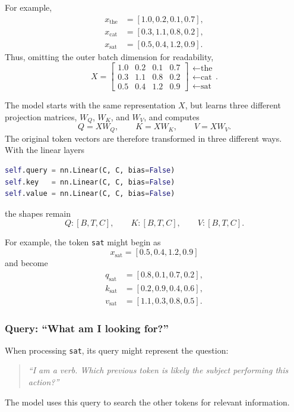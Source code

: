 For example,
\begin{align*}
  x_{\text{the}} &= [1.0,0.2,0.1,0.7],\\
  x_{\text{cat}} &= [0.3,1.1,0.8,0.2],\\
  x_{\text{sat}} &= [0.5,0.4,1.2,0.9].
\end{align*}
Thus, omitting the outer batch dimension for readability,
\[
  X=
  \begin{bmatrix}
    1.0 & 0.2 & 0.1 & 0.7\\
    0.3 & 1.1 & 0.8 & 0.2\\
    0.5 & 0.4 & 1.2 & 0.9
  \end{bmatrix}
  \begin{matrix}
    \leftarrow \text{the}\\
    \leftarrow \text{cat}\\
    \leftarrow \text{sat}
  \end{matrix}.
\]

The model starts with the same representation \(X\), but learns three
different projection matrices, \(W_Q\), \(W_K\), and \(W_V\), and computes
\[
  Q=XW_Q, \qquad K=XW_K, \qquad V=XW_V.
\]
The original token vectors are therefore transformed in three different ways. \\

With the linear layers
\begin{lstlisting}[language=Python]
self.query = nn.Linear(C, C, bias=False)
self.key   = nn.Linear(C, C, bias=False)
self.value = nn.Linear(C, C, bias=False)
\end{lstlisting}
the shapes remain
\[
  Q:[B,T,C], \qquad K:[B,T,C], \qquad V:[B,T,C].
\]

For example, the token \texttt{sat} might begin as
\[
  x_{\text{sat}}=[0.5,0.4,1.2,0.9]
\]
and become
\begin{align*}
  q_{\text{sat}} &= [0.8,0.1,0.7,0.2],\\
  k_{\text{sat}} &= [0.2,0.9,0.4,0.6],\\
  v_{\text{sat}} &= [1.1,0.3,0.8,0.5].
\end{align*}

\subsubsection*{Query: ``What am I looking for?''}

When processing \texttt{sat}, its query might represent the question:
\begin{quote}
  \emph{``I am a verb. Which previous token is likely the subject performing
  this action?''}
\end{quote}
The model uses this query to search the other tokens for relevant information.

